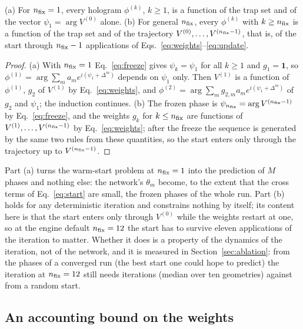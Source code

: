 \begin{proposition}\label{prop:washout}
(a) For $n_{\mathrm{fix}}=1$, every hologram $\phi^{(k)}$, $k\ge1$, is a function of the trap set and of the vector $\psi_1=\arg V^{(0)}$ alone. (b) For general $n_{\mathrm{fix}}$, every $\phi^{(k)}$ with $k\ge n_{\mathrm{fix}}$ is a function of the trap set and of the trajectory $V^{(0)},\dots,V^{(n_{\mathrm{fix}}-1)}$, that is, of the start through $n_{\mathrm{fix}}-1$ applications of Eqs.~\eqref{eq:weights}--\eqref{eq:update}.
\end{proposition}
\begin{proof}
(a) With $n_{\mathrm{fix}}=1$ Eq.~\eqref{eq:freeze} gives $\psi_{k}=\psi_1$ for all $k\ge1$ and $g_1=\mathbf 1$, so $\phi^{(1)}=\arg\sum_ma_me^{i(\psi_1+\Delta^m)}$ depends on $\psi_1$ only. Then $V^{(1)}$ is a function of $\phi^{(1)}$, $g_2$ of $V^{(1)}$ by Eq.~\eqref{eq:weights}, and $\phi^{(2)}=\arg\sum_mg_{2,m}a_me^{i(\psi_1+\Delta^m)}$ of $g_2$ and $\psi_1$; the induction continues. (b) The frozen phase is $\psi_{n_{\mathrm{fix}}}=\arg V^{(n_{\mathrm{fix}}-1)}$ by Eq.~\eqref{eq:freeze}, and the weights $g_k$ for $k\le n_{\mathrm{fix}}$ are functions of $V^{(1)},\dots,V^{(n_{\mathrm{fix}}-1)}$ by Eq.~\eqref{eq:weights}; after the freeze the sequence is generated by the same two rules from these quantities, so the start enters only
through the trajectory up to $V^{(n_{\mathrm{fix}}-1)}$. \end{proof}

Part (a) turns the warm-start problem at $n_{\mathrm{fix}}=1$ into the prediction of $M$ phases and nothing else: the network's $\theta_m$ become, to the extent that the cross terms of Eq.~\eqref{eq:start} are small, the frozen phases of the whole run. Part (b) holds for any deterministic iteration and constrains nothing by itself; its content here is that the start enters only through $V^{(0)}$ while the weights restart at one, so at the engine default $n_{\mathrm{fix}}=12$ the start has to survive eleven applications of the iteration to matter. Whether it does is a property of the dynamics of the iteration, not of the network, and it is measured in Section~\ref{sec:ablation}: from the phases of a converged
run (the best start one could hope to predict) the iteration at $n_{\mathrm{fix}}=12$ still needs \OTwelveMed{} iterations (median over ten geometries) against \ORMed{} from a random start.

\subsection{An accounting bound on the weights}\label{sec:weights-bound}

